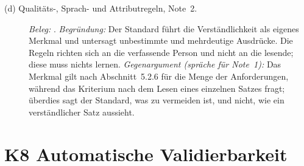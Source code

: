\documentclass[11pt,a4paper]{report}
\begin{document}
\begin{description}
  \item[(d) Qualitäts-, Sprach- und Attributregeln, Note~2.]
  \emph{Beleg:} \cite[Abschn.~5.2.6 und 5.2.7]{iso29148}.
  \emph{Begründung:} Der Standard führt die Verständlichkeit als eigenes
  Merkmal und untersagt unbestimmte und mehrdeutige Ausdrücke. Die
  Regeln richten sich an die verfassende Person und nicht an die
  lesende; diese muss nichts lernen.
  \emph{Gegenargument (spräche für Note~1):} Das Merkmal gilt nach
  Abschnitt~5.2.6 für die Menge der Anforderungen, während das Kriterium
  nach dem Lesen eines einzelnen Satzes fragt; überdies sagt der
  Standard, was zu vermeiden ist, und nicht, wie ein verständlicher Satz
  aussieht.
\end{description}


\section{K8 Automatische Validierbarkeit}
\label{sec:anhang-k8}
\end{document}
